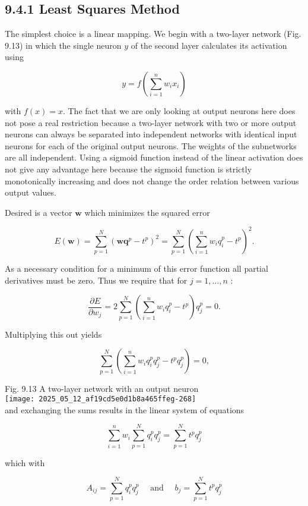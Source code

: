 \documentclass[10pt]{article}
\begin{document}
\subsection*{9.4.1 Least Squares Method}
The simplest choice is a linear mapping. We begin with a two-layer network (Fig. 9.13) in which the single neuron $y$ of the second layer calculates its activation using

$$
y=f\left(\sum_{i=1}^{n} w_{i} x_{i}\right)
$$

with $f(x)=x$. The fact that we are only looking at output neurons here does not pose a real restriction because a two-layer network with two or more output neurons can always be separated into independent networks with identical input neurons for each of the original output neurons. The weights of the subnetworks are all independent. Using a sigmoid function instead of the linear activation does not give any advantage here because the sigmoid function is strictly monotonically increasing and does not change the order relation between various output values.

Desired is a vector $\boldsymbol{w}$ which minimizes the squared error

$$
E(\boldsymbol{w})=\sum_{p=1}^{N}\left(\boldsymbol{w} \boldsymbol{q}^{p}-t^{p}\right)^{2}=\sum_{p=1}^{N}\left(\sum_{i=1}^{n} w_{i} q_{i}^{p}-t^{p}\right)^{2} .
$$

As a necessary condition for a minimum of this error function all partial derivatives must be zero. Thus we require that for $j=1, \ldots, n$ :

$$
\frac{\partial E}{\partial w_{j}}=2 \sum_{p=1}^{N}\left(\sum_{i=1}^{n} w_{i} q_{i}^{p}-t^{p}\right) q_{j}^{p}=0 .
$$

Multiplying this out yields

$$
\sum_{p=1}^{N}\left(\sum_{i=1}^{n} w_{i} q_{i}^{p} q_{j}^{p}-t^{p} q_{j}^{p}\right)=0,
$$

Fig. 9.13 A two-layer network with an output neuron\\
\texttt{[image: 2025\_05\_12\_af19cd5e0d1b8a465ffeg-268]}\\
and exchanging the sums results in the linear system of equations

$$
\sum_{i=1}^{n} w_{i} \sum_{p=1}^{N} q_{i}^{p} q_{j}^{p}=\sum_{p=1}^{N} t^{p} q_{j}^{p}
$$

which with


\begin{equation*}
A_{i j}=\sum_{p=1}^{N} q_{i}^{p} q_{j}^{p} \quad \text { and } \quad b_{j}=\sum_{p=1}^{N} t^{p} q_{j}^{p} \tag{9.12}
\end{equation*}
\end{document}
